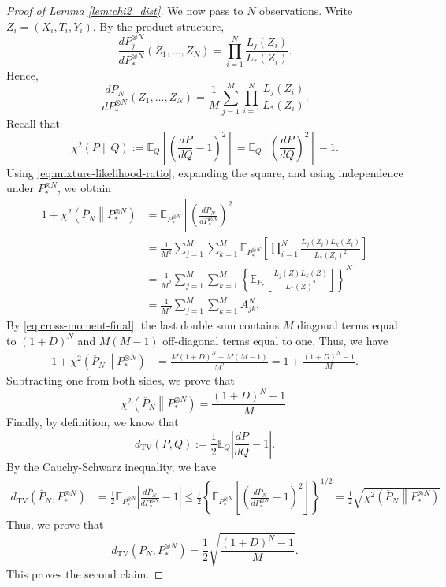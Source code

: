 \documentclass[11pt]{article}
\begin{document}
\begin{proof}[Proof of Lemma \ref{lem:chi2_dist}]
We now pass to \(N\) observations.  Write
\(Z_i=(X_i,T_i,Y_i)\).  By the product structure,
\[
\frac{dP_j^{\otimes N}}{dP_*^{\otimes N}}(Z_1,\ldots,Z_N)
=
\prod_{i=1}^N\frac{L_j(Z_i)}{L_*(Z_i)}.
\]
Hence,
\begin{equation}
\frac{d\overline P_N}{dP_*^{\otimes N}}(Z_1,\ldots,Z_N)
=
\frac1M\sum_{j=1}^M
\prod_{i=1}^N\frac{L_j(Z_i)}{L_*(Z_i)}.
\label{eq:mixture-likelihood-ratio}
\end{equation}
Recall that
\[
\chi^2(P\|Q)
:=
\mathbb E_Q
\left[
\left(\frac{dP}{dQ}-1\right)^2
\right]
=
\mathbb E_Q
\left[
\left(\frac{dP}{dQ}\right)^2
\right]-1.
\]
Using \eqref{eq:mixture-likelihood-ratio}, expanding the square, and using
independence under \(P_*^{\otimes N}\), we obtain
\begin{align}
1+
\chi^2\!\left(\overline P_N\middle\|P_*^{\otimes N}\right)
&=
\mathbb E_{P_*^{\otimes N}}
\left[
\left(
\frac{d\overline P_N}{dP_*^{\otimes N}}
\right)^2
\right] \nonumber\\
&=
\frac1{M^2}
\sum_{j=1}^M\sum_{k=1}^M
\mathbb E_{P_*^{\otimes N}}
\left[
\prod_{i=1}^N
\frac{L_j(Z_i)L_k(Z_i)}{L_*(Z_i)^2}
\right]
\nonumber\\
&=
\frac1{M^2}
\sum_{j=1}^M\sum_{k=1}^M
\left\{
\mathbb E_{P_*}
\left[
\frac{L_j(Z)L_k(Z)}{L_*(Z)^2}
\right]
\right\}^{N}
\nonumber\\
&=
\frac1{M^2}
\sum_{j=1}^M\sum_{k=1}^M A_{jk}^N.
\label{eq:mixture-second-moment}
\end{align}
By \eqref{eq:cross-moment-final}, the last double sum contains \(M\)
diagonal terms equal to \((1+D)^N\) and \(M(M-1)\) off-diagonal terms
equal to one.  Thus, we have
\begin{align*}
1+
\chi^2\!\left(\overline P_N\middle\|P_*^{\otimes N}\right)
&=
\frac{M(1+D)^N+M(M-1)}{M^2}
=
1+\frac{(1+D)^N-1}{M}.
\end{align*}
Subtracting one from both sides, we prove that
\[
\chi^2\!\left(\overline P_N\middle\|P_*^{\otimes N}\right)
=
\frac{(1+D)^N-1}{M}.
\]
Finally, by definition, we know that
\[
d_{\mathrm{TV}}(P,Q)
:=
\frac12
\mathbb E_Q
\left|
\frac{dP}{dQ}-1
\right|.
\]
By the Cauchy-Schwarz inequality, we have
\begin{align*}
d_{\mathrm{TV}}\!\left(\overline P_N,P_*^{\otimes N}\right)
&=
\frac12
\mathbb E_{P_*^{\otimes N}}
\left|
\frac{d\overline P_N}{dP_*^{\otimes N}}-1
\right|
\leq
\frac12
\left\{
\mathbb E_{P_*^{\otimes N}}
\left[
\left(
\frac{d\overline P_N}{dP_*^{\otimes N}}-1
\right)^2
\right]
\right\}^{1/2}
=
\frac12
\sqrt{
\chi^2\!\left(\overline P_N\middle\|P_*^{\otimes N}\right)
}
\end{align*}
Thus, we prove that
\[
d_{\mathrm{TV}}\!\left(\overline P_N,P_*^{\otimes N}\right)=
\frac12
\sqrt{\frac{(1+D)^N-1}{M}}.
\]
This proves the second claim.
\end{proof}
\end{document}
